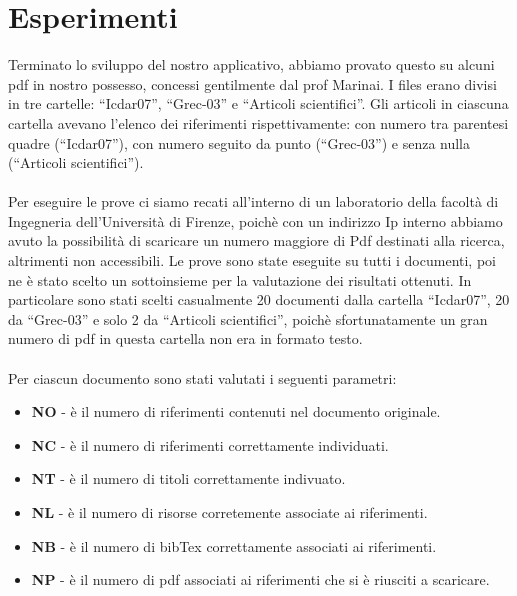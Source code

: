 \section{Esperimenti} \label{esperimenti}
Terminato lo sviluppo del nostro applicativo, abbiamo provato questo su alcuni pdf in nostro possesso, concessi gentilmente dal prof Marinai.  I files erano divisi in tre cartelle: ``Icdar07'', ``Grec-03'' e ``Articoli scientifici''. Gli articoli in ciascuna cartella avevano l'elenco dei riferimenti rispettivamente: con numero tra parentesi quadre (``Icdar07''), con numero seguito da punto (``Grec-03'') e senza nulla (``Articoli scientifici''). 
\\~\\
Per eseguire le prove ci siamo recati all'interno di un laboratorio della facoltà di Ingegneria dell'Università di Firenze, poichè con un indirizzo Ip interno abbiamo avuto la possibilità di scaricare un numero maggiore di Pdf destinati alla ricerca, altrimenti non accessibili.
Le prove sono state eseguite su tutti i documenti, poi ne è stato scelto un sottoinsieme per la valutazione dei risultati ottenuti. In particolare sono stati scelti casualmente 20 documenti dalla cartella ``Icdar07'', 20 da ``Grec-03'' e solo 2 da ``Articoli scientifici'', poichè sfortunatamente un gran numero di pdf in questa cartella non era in formato testo.
\\~\\
Per ciascun documento sono stati valutati i seguenti parametri:
\begin{itemize}
 \item \textbf{NO} - è il numero di riferimenti contenuti nel documento originale.
 \item \textbf{NC} - è il numero di riferimenti correttamente individuati. 
 \item \textbf{NT} - è il numero di titoli correttamente indivuato.
 \item \textbf{NL} - è il numero di risorse corretemente associate ai riferimenti.
 \item \textbf{NB} - è il numero di bibTex correttamente associati ai riferimenti.
 \item \textbf{NP} - è il numero di pdf associati ai riferimenti che si è riusciti a scaricare. 
\end{itemize}

